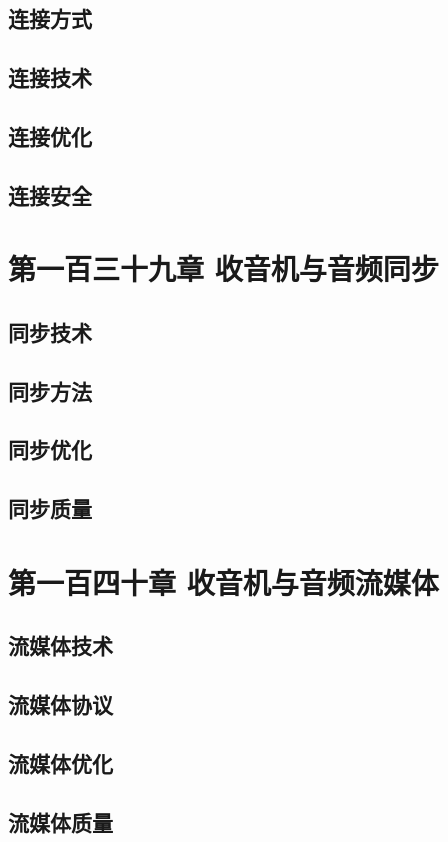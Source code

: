 \documentclass[12pt,UTF8]{ctexbook}
\begin{document}
\section{连接方式}
\section{连接技术}
\section{连接优化}
\section{连接安全}

\chapter{第一百三十九章 收音机与音频同步}

\section{同步技术}
\section{同步方法}
\section{同步优化}
\section{同步质量}

\chapter{第一百四十章 收音机与音频流媒体}

\section{流媒体技术}
\section{流媒体协议}
\section{流媒体优化}
\section{流媒体质量}
\end{document}
